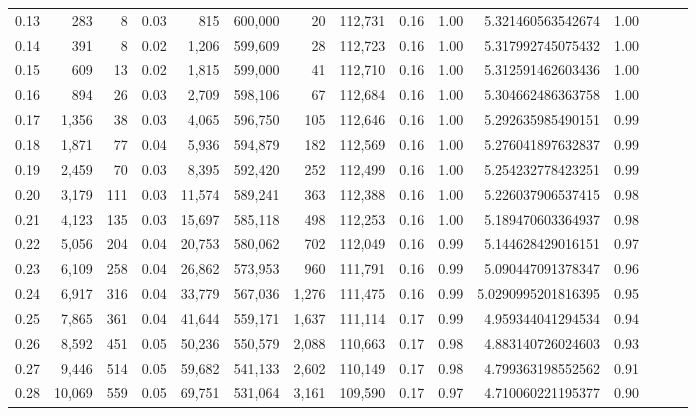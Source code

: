 \begin{tabular}{rrrrrrrrrrrrrrr}
0.13 &     283 &      8 &  0.03 &      815 &  600,000 &       20 &  112,731 &  0.16 &  1.00 &       5.321460563542674 &      1.00 \\
0.14 &     391 &      8 &  0.02 &    1,206 &  599,609 &       28 &  112,723 &  0.16 &  1.00 &       5.317992745075432 &      1.00 \\
0.15 &     609 &     13 &  0.02 &    1,815 &  599,000 &       41 &  112,710 &  0.16 &  1.00 &       5.312591462603436 &      1.00 \\
0.16 &     894 &     26 &  0.03 &    2,709 &  598,106 &       67 &  112,684 &  0.16 &  1.00 &       5.304662486363758 &      1.00 \\
0.17 &   1,356 &     38 &  0.03 &    4,065 &  596,750 &      105 &  112,646 &  0.16 &  1.00 &       5.292635985490151 &      0.99 \\
0.18 &   1,871 &     77 &  0.04 &    5,936 &  594,879 &      182 &  112,569 &  0.16 &  1.00 &       5.276041897632837 &      0.99 \\
0.19 &   2,459 &     70 &  0.03 &    8,395 &  592,420 &      252 &  112,499 &  0.16 &  1.00 &       5.254232778423251 &      0.99 \\
0.20 &   3,179 &    111 &  0.03 &   11,574 &  589,241 &      363 &  112,388 &  0.16 &  1.00 &       5.226037906537415 &      0.98 \\
0.21 &   4,123 &    135 &  0.03 &   15,697 &  585,118 &      498 &  112,253 &  0.16 &  1.00 &       5.189470603364937 &      0.98 \\
0.22 &   5,056 &    204 &  0.04 &   20,753 &  580,062 &      702 &  112,049 &  0.16 &  0.99 &       5.144628429016151 &      0.97 \\
0.23 &   6,109 &    258 &  0.04 &   26,862 &  573,953 &      960 &  111,791 &  0.16 &  0.99 &       5.090447091378347 &      0.96 \\
0.24 &   6,917 &    316 &  0.04 &   33,779 &  567,036 &    1,276 &  111,475 &  0.16 &  0.99 &      5.0290995201816395 &      0.95 \\
0.25 &   7,865 &    361 &  0.04 &   41,644 &  559,171 &    1,637 &  111,114 &  0.17 &  0.99 &       4.959344041294534 &      0.94 \\
0.26 &   8,592 &    451 &  0.05 &   50,236 &  550,579 &    2,088 &  110,663 &  0.17 &  0.98 &       4.883140726024603 &      0.93 \\
0.27 &   9,446 &    514 &  0.05 &   59,682 &  541,133 &    2,602 &  110,149 &  0.17 &  0.98 &       4.799363198552562 &      0.91 \\
0.28 &  10,069 &    559 &  0.05 &   69,751 &  531,064 &    3,161 &  109,590 &  0.17 &  0.97 &       4.710060221195377 &      0.90 \\

\end{tabular}
